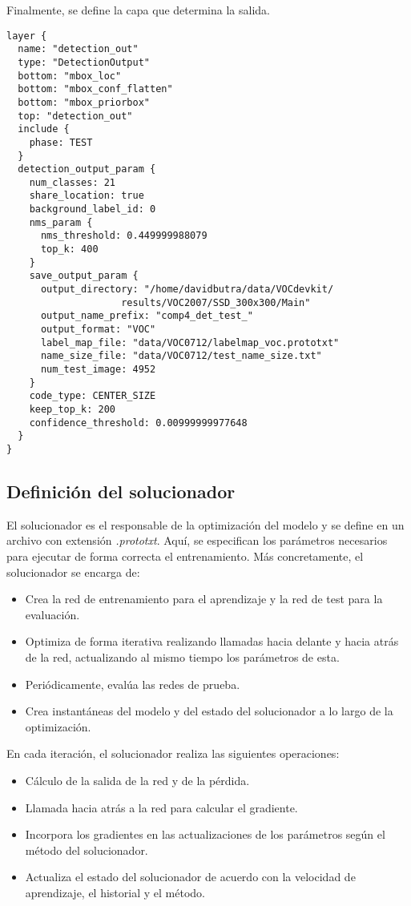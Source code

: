 \documentclass[a4paper, 12pt, spanish, chapterprefix, numbers=noenddot]{book}
\begin{document}
Finalmente, se define la capa que determina la salida.\\

\begin{lstlisting}[frame=single]
layer {
  name: "detection_out"
  type: "DetectionOutput"
  bottom: "mbox_loc"
  bottom: "mbox_conf_flatten"
  bottom: "mbox_priorbox"
  top: "detection_out"
  include {
    phase: TEST
  }
  detection_output_param {
    num_classes: 21
    share_location: true
    background_label_id: 0
    nms_param {
      nms_threshold: 0.449999988079
      top_k: 400
    }
    save_output_param {
      output_directory: "/home/davidbutra/data/VOCdevkit/
      				results/VOC2007/SSD_300x300/Main"
      output_name_prefix: "comp4_det_test_"
      output_format: "VOC"
      label_map_file: "data/VOC0712/labelmap_voc.prototxt"
      name_size_file: "data/VOC0712/test_name_size.txt"
      num_test_image: 4952
    }
    code_type: CENTER_SIZE
    keep_top_k: 200
    confidence_threshold: 0.00999999977648
  }
}
\end{lstlisting}

\subsection{Definición del solucionador}

El solucionador es el responsable de la optimización del modelo y se define en un archivo con extensión \textit{.prototxt}. Aquí, se especifican los parámetros necesarios para ejecutar de forma correcta el entrenamiento. Más concretamente, el solucionador se encarga de:

\begin{itemize}
\item Crea la red de entrenamiento para el aprendizaje y la red de test para la evaluación.
\item Optimiza de forma iterativa realizando llamadas hacia delante y hacia atrás de la red, actualizando al mismo tiempo los parámetros de esta.
\item Periódicamente, evalúa las redes de prueba.
\item Crea instantáneas del modelo y del estado del solucionador a lo largo de la optimización.
\end{itemize}

En cada iteración, el solucionador realiza las siguientes operaciones:

\begin{itemize}
\item Cálculo de la salida de la red y de la pérdida.
\item Llamada hacia atrás a la red para calcular el gradiente.
\item Incorpora los gradientes en las actualizaciones de los parámetros según el método del solucionador.
\item Actualiza el estado del solucionador de acuerdo con la velocidad de aprendizaje, el historial y el método.
\end{itemize}
\end{document}

